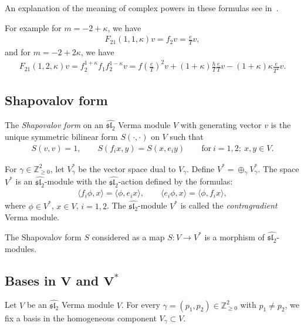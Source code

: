 \documentclass[pdftex]{sigma}
\numberwithin{equation}{section}
\begin{document}
An explanation of the meaning of complex powers in these formulas see in~\cite{MFF}.

For example for $m=-2+\kappa$, we have
\begin{gather*}
F_{21}(1,1,\kappa)v=f_2v=\frac{e}{T}v,
\end{gather*}
and for $m=-2+2\kappa$, we have
\begin{gather*}
F_{21}(1,2,\kappa)v=f_2^{1+\kappa} f_1f_2^{1-\kappa}v=f\left(\frac{e}{T}\right)^2 v+(1+\kappa)\frac{h}{T} \frac{e}{T}v-(1+\kappa)\kappa\frac{e}{T^2}v.
\end{gather*}

\subsection{Shapovalov form}\label{contra}
The {\em Shapovalov form} on an $\widehat{{\mathfrak{sl}_2}}$ Verma module $V$ with generating vector $v$ is the unique symmetric bilinear form $S(\cdot,\cdot)$ on $V$ such that
\begin{gather*}
S(v,v)=1,\qquad S(f_ix,y)=S(x,e_iy) \qquad \text{for} \ i=1,2;\ x,y\in V.
\end{gather*}

For $\gamma\in{\mathbb Z}^2_{\geq 0}$, let $V^*_{\gamma}$ be the vector space dual to $V_{\gamma}$. Define $V^*=\oplus_\gamma V_{\gamma}^*$. The space $V^*$ is an $\widehat{{\mathfrak{sl}_2}}$-module with the $\widehat{{\mathfrak{sl}_2}}$-action defined by the formulas:
\begin{gather*}
\langle f_i\phi,x\rangle=\langle \phi,e_ix\rangle, \qquad \langle e_i\phi,x\rangle=\langle\phi,f_ix\rangle ,
\end{gather*}
where $\phi\in V^*$, $x\in V$, $i=1,2 $. The $\widehat{{\mathfrak{sl}_2}}$-module $V^*$ is called the {\em contragradient} Verma module.

The Shapovalov form $S$ considered as a map $S\colon V\longrightarrow V^*$ is a morphism of $\widehat{{\mathfrak{sl}_2}}$-modules.

\subsection[Bases in $V$ and $V^*$]{Bases in $\boldsymbol{V}$ and $\boldsymbol{V^*}$}\label{BASIS}
Let $V$ be an $\widehat{{\mathfrak{sl}_2}}$ Verma module $V$. For every $\gamma=(p_1,p_2)\in{\mathbb Z}^2_{\geq 0}$ with $p_1\ne p_2$, we fix a basis in the homogeneous component $V_{\gamma}\subset V$.
\end{document}
